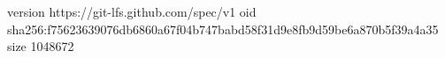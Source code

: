 version https://git-lfs.github.com/spec/v1
oid sha256:f75623639076db6860a67f04b747babd58f31d9e8fb9d59be6a870b5f39a4a35
size 1048672
